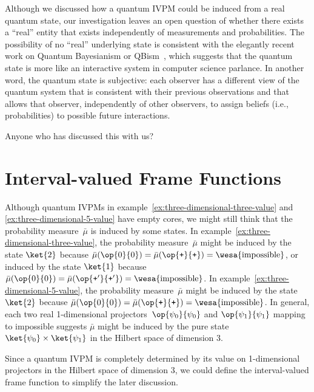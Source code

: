 \documentclass[12pt]{iopart}
\theoremstyle{plain}
\theoremstyle{definition}
\theoremstyle{remark}
\newcommand{\imposs}{{\mbox{\wesa{impossible}}}}
\newcommand{\proj}[1]{\op{#1}{#1}}
\newcommand{\ps}{\texttt{+}}
\begin{document}
Although we discussed how a quantum IVPM could be induced from a real
quantum state, our investigation leaves an open question of whether
there exists a ``real'' entity that exists independently of measurements
and probabilities. The possibility of no ``real'' underlying state
is consistent with the elegantly recent work on Quantum Bayesianism
or QBism~\cite{FuchsSchack2013,FuchsMerminSchack2014,VonBaeyer2016},
which suggests that the quantum state is more like an interactive
system in computer science parlance. In another word, the quantum
state is subjective: each observer has a different view of the quantum
system that is consistent with their previous observations and that
allows that observer, independently of other observers, to assign
beliefs (i.e., probabilities) to possible future interactions.

\ack

Anyone who has discussed this with us?

\appendix

\section{Interval-valued Frame Functions\label{sec:Interval-valued-Frame-Functions}}

Although quantum IVPMs in example~\ref{ex:three-dimensional-three-value}
and \ref{ex:three-dimensional-5-value} have empty cores, we might
still think that the probability measure~$\bar{\mu}$ is induced
by some states. In example~\ref{ex:three-dimensional-three-value},
the probability measure~$\bar{\mu}$ might be induced by the state
$\ket{2}$ because $\bar{\mu}(\proj{0})=\bar{\mu}(\proj{\ps})=\imposs$,
or induced by the state $\ket{1}$ because $\bar{\mu}(\proj{0})=\bar{\mu}(\proj{\ps'})=\imposs$.
In example~\ref{ex:three-dimensional-5-value}, the probability measure~$\bar{\mu}$
might be induced by the state $\ket{2}$ because $\bar{\mu}(\proj{0})=\bar{\mu}(\proj{\ps})=\imposs$.
In general, each two real 1-dimensional projectors~$\proj{\psi_{0}}$
and $\proj{\psi_{1}}$ mapping to impossible suggests $\bar{\mu}$
might be induced by the pure state~$\ket{\psi_{0}}\times\ket{\psi_{1}}$
in the Hilbert space of dimension 3.

Since a quantum IVPM is completely determined by its value on 1-dimensional
projectors in the Hilbert space of dimension 3, we could define the
interval-valued frame function to simplify the later discussion.
\end{document}
